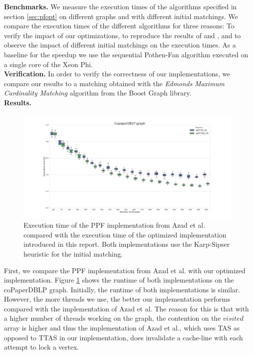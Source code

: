 \documentclass[letterpaper]{article}
\newcommand{\mypar}[1]{{\bf #1.}}
\begin{document}
\mypar{Benchmarks}
We measure the execution times of the algorithms specified in section \ref{sec:pfopt} on different graphs and with different initial matchings. We compare the execution times of the different algorithms for three reasons: To verify the impact of our optimizations, to reproduce the results of \cite{Azad:2012} and \cite{Azad:2015}, and to observe the impact of different initial matchings on the execution times. As a baseline for the speedup we use the sequential Pothen-Fan algorithm executed on a single core of the Xeon Phi.\\

\mypar{Verification}
In order to verify the correctness of our implementations, we compare our results to a matching obtained with the \textit{Edmonds Maximum Cardinality Matching} algorithm \cite{BoostEdmonds} from the Boost Graph library.\\

\mypar{Results}
\begin{figure}
	\caption{Execution time of the PPF implementation from Azad et al. compared with the execution time of the optimized implementation introduced in this report. Both implementations use the Karp-Sipser heuristic for the initial matching.}
	\label{fig:tasvsttas}
	\includegraphics[width=\textwidth]{../../plot/output/report/coPaperDBLP_PPFTASvsPPFTTAS.png}
\end{figure}
First, we compare the PPF implementation from Azad et al. with our optimized implementation. Figure \ref{fig:tasvsttas} shows the runtime of both implementations on the coPaperDBLP graph. Initially, the runtime of both implementations is similar. However, the more threads we use, the better our implementation performs compared with the implementation of Azad et al. The reason for this is that with a higher number of threads working on the graph, the contention on the $visited$ array is higher and thus the  implementation of Azad et al., which uses TAS as opposed to TTAS in our implementation, does invalidate a cache-line with each attempt to lock a vertex.\\
\end{document}
